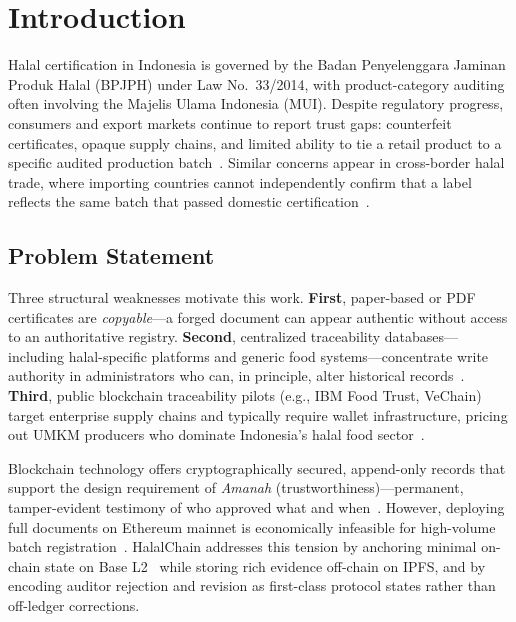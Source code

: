 \section{Introduction}
\label{sec:intro}

Halal certification in Indonesia is governed by the Badan Penyelenggara Jaminan Produk Halal (BPJPH) under Law No.~33/2014, with product-category auditing often involving the Majelis Ulama Indonesia (MUI).
Despite regulatory progress, consumers and export markets continue to report trust gaps: counterfeit certificates, opaque supply chains, and limited ability to tie a retail product to a specific audited production batch~\cite{sidarto2021halal,rashid2018halal}.
Similar concerns appear in cross-border halal trade, where importing countries cannot independently confirm that a label reflects the same batch that passed domestic certification~\cite{marianingsih2024halal,rejeb2018halal}.

\subsection{Problem Statement}
Three structural weaknesses motivate this work.
\textbf{First}, paper-based or PDF certificates are \emph{copyable}---a forged document can appear authentic without access to an authoritative registry.
\textbf{Second}, centralized traceability databases---including halal-specific platforms and generic food systems---concentrate write authority in administrators who can, in principle, alter historical records~\cite{kshetri2018blockchain,underwood2016blockchain,viriyasitavat2019blockchain}.
\textbf{Third}, public blockchain traceability pilots (e.g., IBM Food Trust, VeChain) target enterprise supply chains and typically require wallet infrastructure, pricing out UMKM producers who dominate Indonesia's halal food sector~\cite{kamath2018blockchain,kamilaris2019blockchain}.

Blockchain technology offers cryptographically secured, append-only records that support the design requirement of \emph{Amanah} (trustworthiness)---permanent, tamper-evident testimony of who approved what and when~\cite{zheng2020overview,christidis2016blockchain}.
However, deploying full documents on Ethereum mainnet is economically infeasible for high-volume batch registration~\cite{benet2014ipfs,rejeb2020blockchain}.
HalalChain addresses this tension by anchoring minimal on-chain state on Base L2~\cite{base2024docs,optimism2024spec} while storing rich evidence off-chain on IPFS, and by encoding auditor rejection and revision as first-class protocol states rather than off-ledger corrections.

